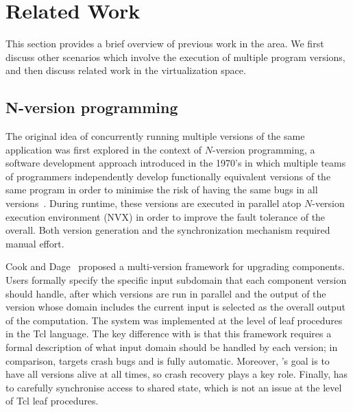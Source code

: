 \chapter{Related Work}
\label{chap:related}

This section provides a brief overview of previous work in the area.  We first
discuss other scenarios which involve the execution of multiple program
versions, and then discuss related work in the virtualization space.

\section{N-version programming}

The original idea of concurrently running multiple versions of the same
application was first explored in the context of $N$-version programming, a
software development approach introduced in the 1970's in which multiple teams
of programmers independently develop functionally equivalent versions of the
same program in order to minimise the risk of having the same bugs in all
versions~\cite{chen1995}. During runtime, these versions are executed in
parallel atop $N$-version execution environment (NVX)  in order to improve the
fault tolerance of the overall. Both version generation and the synchronization
mechanism required manual effort.



Cook and Dage~\cite{cook:icse99} proposed a multi-version framework for
upgrading components.  Users formally specify the specific input subdomain that
each component version should handle, after which versions are run in parallel
and the output of the version whose domain includes the current input is
selected as the overall output of the computation.  The system was implemented
at the level of leaf procedures in the Tcl language.  The key difference with
\mx is that this framework requires a formal description of what input domain
should be handled by each version; in comparison, \mx targets crash bugs and is
fully automatic.  Moreover, \mx's goal is to have all versions alive at all
times, so crash recovery plays a key role.  Finally, \mx has to carefully
synchronise access to shared state, which is not an issue at the level of Tcl
leaf procedures.

